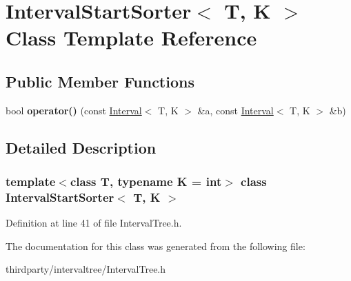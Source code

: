 \hypertarget{class_interval_start_sorter}{}\section{Interval\+Start\+Sorter$<$ T, K $>$ Class Template Reference}
\label{class_interval_start_sorter}
\subsection*{Public Member Functions}
\begin{DoxyCompactItemize}
\item 
\mbox{\label{class_interval_start_sorter_a79d0f5c23a59e67701e63d3e147ba7d6}} 
bool {\bfseries operator()} (const \hyperlink{class_interval}{Interval}$<$ T, K $>$ \&a, const \hyperlink{class_interval}{Interval}$<$ T, K $>$ \&b)
\end{DoxyCompactItemize}


\subsection{Detailed Description}
\subsubsection*{template$<$class T, typename K = int$>$\newline
class Interval\+Start\+Sorter$<$ T, K $>$}



Definition at line 41 of file Interval\+Tree.\+h.



The documentation for this class was generated from the following file\+:\begin{DoxyCompactItemize}
\item 
thirdparty/intervaltree/Interval\+Tree.\+h\end{DoxyCompactItemize}
